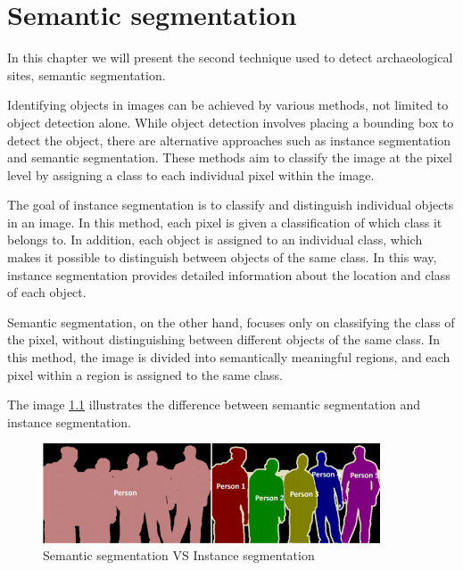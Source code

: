 

\chapter{Semantic segmentation}
\label{chapter:unet}

\begin{introduction}
In this chapter we will present the second technique used to detect archaeological sites, semantic segmentation.
\end{introduction}

Identifying objects in images can be achieved by various methods, not limited to object detection alone. While object detection involves placing a bounding box to detect the object, there are alternative approaches such as instance segmentation and semantic segmentation. These methods aim to classify the image at the pixel level by assigning a class to each individual pixel within the image.

The goal of instance segmentation is to classify and distinguish individual objects in an image. In this method, each pixel is given a classification of which class it belongs to. In addition, each object is assigned to an individual class, which makes it possible to distinguish between objects of the same class. In this way, instance segmentation provides detailed information about the location and class of each object.

Semantic segmentation, on the other hand, focuses only on classifying the class of the pixel, without distinguishing between different objects of the same class. In this method, the image is divided into semantically meaningful regions, and each pixel within a region is assigned to the same class.

The image \ref{Semantic segmentation VS Instance segmentation} illustrates the difference between semantic segmentation and instance segmentation.

\begin{figure}[H]
\centering
\includegraphics[width=10cm]{images/semanticVSinstance.png}
\caption[Semantic segmentation VS Instance segmentation]{Semantic segmentation VS Instance segmentation \cite{semanticvsinstance}}
\label{Semantic segmentation VS Instance segmentation}
\end{figure}



